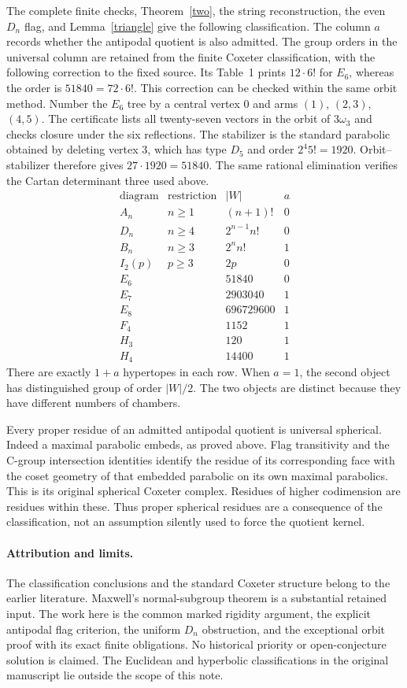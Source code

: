 \documentclass[11pt,a4paper]{article}
\begin{document}
The complete finite checks, Theorem~\ref{two}, the string reconstruction,
the even $D_n$ flag, and Lemma~\ref{triangle} give the following classification.
The column $a$ records whether the antipodal quotient is also admitted.
The group orders in the universal column are retained from the finite
Coxeter classification, with the following correction to the fixed source.
Its Table~1 prints $12\cdot6!$ for $E_6$, whereas the order is
$51840=72\cdot6!$. This correction can be checked within the same orbit
method. Number the $E_6$ tree by a central vertex $0$ and arms $(1)$,
$(2,3)$, $(4,5)$. The certificate lists all twenty-seven vectors in the
orbit of $3\omega_3$ and checks closure under the six reflections. The
stabilizer is the standard parabolic obtained by deleting vertex $3$,
which has type $D_5$ and order $2^4 5!=1920$. Orbit--stabilizer therefore
gives $27\cdot1920=51840$. The same rational elimination verifies the
Cartan determinant three used above.
\[
\begin{array}{c|c|r|c}
\text{diagram}&\text{restriction}&|W|&a\\\hline
A_n&n\geq1&(n+1)!&0\\
D_n&n\geq4&2^{n-1}n!&0\\
B_n&n\geq3&2^nn!&1\\
I_2(p)&p\geq3&2p&0\\
E_6&&51840&0\\
E_7&&2903040&1\\
E_8&&696729600&1\\
F_4&&1152&1\\
H_3&&120&1\\
H_4&&14400&1
\end{array}
\]
There are exactly $1+a$ hypertopes in each row. When $a=1$, the second
object has distinguished group of order $|W|/2$. The two objects are
distinct because they have different numbers of chambers.

Every proper residue of an admitted antipodal quotient is universal
spherical. Indeed a maximal parabolic embeds, as proved above. Flag
transitivity and the C-group intersection identities identify the residue
of its corresponding face with the coset geometry of that embedded
parabolic on its own maximal parabolics. This is its original spherical
Coxeter complex. Residues of higher codimension are residues within these.
Thus proper spherical residues are a consequence of the classification,
not an assumption silently used to force the quotient kernel.

\paragraph{Attribution and limits.}
The classification conclusions and the standard Coxeter structure belong
to the earlier literature. Maxwell's normal-subgroup theorem is a substantial
retained input. The work here is the common marked rigidity argument, the
explicit antipodal flag criterion, the uniform $D_n$ obstruction, and the
exceptional orbit proof with its exact finite obligations. No historical
priority or open-conjecture solution is claimed. The Euclidean and hyperbolic
classifications in the original manuscript lie outside the scope of this note.
\end{document}
